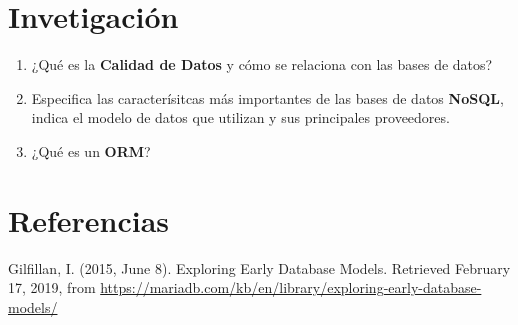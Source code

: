 \documentclass{article}
\begin{document}
    \section{Invetigación}
    \begin{enumerate}[label=\alph*.]
        \item {
            ¿Qué es la \textbf{Calidad de Datos} y cómo se relaciona con las 
            bases de datos?
        }
        \item {
            Especifica las caracterísitcas más importantes de las bases de datos
            \textbf{NoSQL}, indica el modelo de datos que utilizan y sus 
            principales proveedores.
        }
        \item {
            ¿Qué es un \textbf{ORM}?
        }
    \end{enumerate}

    \section{Referencias}
    \begin{thebibliography}{}
            Gilfillan, I. (2015, June 8). Exploring Early Database Models. 
            Retrieved February 17, 2019, from 
            \href{https://mariadb.com/kb/en/library/exploring-early-database-models/}
            {https://mariadb.com/kb/en/library/exploring-early-database-models/}
    \end{thebibliography}
\end{document}
